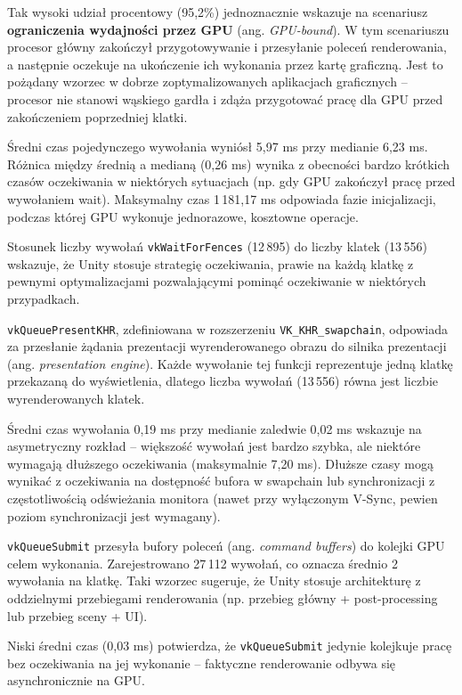 Tak wysoki udział procentowy (95,2\%) jednoznacznie wskazuje na scenariusz \textbf{ograniczenia wydajności przez GPU} (ang. \textit{GPU-bound}). 
W tym scenariuszu procesor główny zakończył przygotowywanie i przesyłanie poleceń renderowania, a następnie oczekuje na ukończenie ich wykonania 
przez kartę graficzną. Jest to pożądany wzorzec w dobrze zoptymalizowanych aplikacjach graficznych -- procesor nie stanowi wąskiego gardła i 
zdąża przygotować pracę dla GPU przed zakończeniem poprzedniej klatki.

Średni czas pojedynczego wywołania wyniósł 5,97 ms przy medianie 6,23 ms. 
Różnica między średnią a medianą (0,26 ms) wynika z obecności bardzo krótkich 
czasów oczekiwania w niektórych sytuacjach (np. gdy GPU zakończył pracę przed wywołaniem wait). 
Maksymalny czas 1\,181,17 ms odpowiada fazie 
inicjalizacji, podczas której GPU wykonuje jednorazowe, kosztowne operacje.

Stosunek liczby wywołań \texttt{vkWaitForFences} (12\,895) do liczby klatek (13\,556) wskazuje, że 
Unity stosuje strategię oczekiwania, prawie na 
każdą klatkę z pewnymi optymalizacjami pozwalającymi pominąć oczekiwanie w niektórych przypadkach.


\texttt{vkQueuePresentKHR}, zdefiniowana w rozszerzeniu \texttt{VK\_KHR\_swapchain}, odpowiada za przesłanie żądania prezentacji 
wyrenderowanego obrazu do silnika prezentacji (ang. \textit{presentation engine}). Każde wywołanie tej funkcji reprezentuje jedną klatkę przekazaną 
do wyświetlenia, dlatego liczba wywołań (13\,556) równa jest liczbie wyrenderowanych klatek.

Średni czas wywołania 0,19 ms przy medianie zaledwie 0,02 ms wskazuje na asymetryczny rozkład -- większość wywołań jest bardzo szybka, ale niektóre 
wymagają dłuższego oczekiwania (maksymalnie 7,20 ms). Dłuższe czasy mogą wynikać z oczekiwania na dostępność bufora w swapchain lub synchronizacji z 
częstotliwością odświeżania monitora (nawet przy wyłączonym V-Sync, pewien poziom synchronizacji jest wymagany).


\texttt{vkQueueSubmit} przesyła bufory poleceń (ang. \textit{command buffers}) do kolejki GPU celem wykonania. Zarejestrowano 27\,112 wywołań, co 
oznacza średnio 2 wywołania na klatkę. Taki wzorzec sugeruje, że Unity stosuje architekturę z oddzielnymi przebiegami renderowania 
(np. przebieg główny + post-processing lub przebieg sceny + UI).

Niski średni czas (0,03 ms) potwierdza, że \texttt{vkQueueSubmit} jedynie kolejkuje pracę bez oczekiwania na jej wykonanie -- faktyczne renderowanie 
odbywa się asynchronicznie na GPU.

